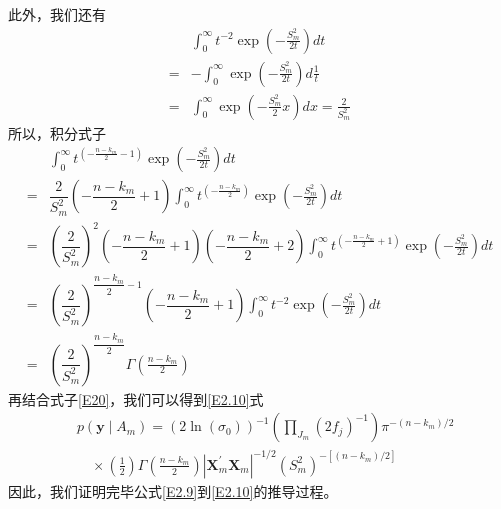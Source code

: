 \documentclass[12pt]{article} %
\begin{document}
	此外，我们还有
	\begin{equation*}
		\begin{aligned}
			& \int_{0}^{\infty} t^{-2} \exp \left(-\frac{S_{m}^{2}}{2 t}\right) d t \\
			=&-\int_{0}^{\infty} \exp \left(-\frac{S_{m}^{2}}{2 t}\right) d \frac{1}{t} \\
			=& \int_{0}^{\infty} \exp \left(-\frac{S_{m}^{2}}{2} x\right) d x 
			= \frac{2}{S_{m}^{2}}
		\end{aligned}
	\end{equation*}
	所以，积分式子
	\begin{equation*}
		\begin{aligned}
			&\int_{0}^{\infty} t^{(-\frac{n-k_{m}}{2}-1)} \exp \left(-\frac{S_{m}^{2}}{2 t}\right) d t \\
			=& \dfrac{2}{S_m^2} (-\dfrac{n-k_m}{2}+1) \int_{0}^{\infty} t^{(-\frac{n-k_{m}}{2})} \exp \left(-\frac{S_{m}^{2}}{2 t}\right) d t \\
			=& \left( \dfrac{2}{S_m^2} \right)^2 (-\dfrac{n-k_m}{2}+1) (-\dfrac{n-k_m}{2}+2) \int_{0}^{\infty} t^{(-\frac{n-k_{m}}{2} +1)} \exp \left(-\frac{S_{m}^{2}}{2 t}\right) d t \\
			=&\left( \dfrac{2}{S_m^2} \right)^{\dfrac{n-k_m}{2}-1}  (-\dfrac{n-k_m}{2}+1) \int_{0}^{\infty} t^{-2} \exp \left(-\frac{S_{m}^{2}}{2 t}\right) d t \\
			=&\left( \dfrac{2}{S_m^2} \right)^{\dfrac{n-k_m}{2}} \Gamma\left(\frac{n-k_{m}}{2}\right)
		\end{aligned}
	\end{equation*}
	再结合式子\eqref{E20}，我们可以得到\eqref{E2.10}式
	\begin{equation*}
		\begin{aligned}
			&p\left(\mathbf{y} \mid A_{m}\right)=\left(2 \ln \left(\sigma_{0}\right)\right)^{-1}\left(\prod_{J_{m}}\left(2 f_{j}\right)^{-1}\right) \pi^{-\left(n-k_{m}\right) / 2} \\
			&\quad \times\left(\frac{1}{2}\right) \Gamma\left(\frac{n-k_{m}}{2}\right)\left|\mathbf{X}_{m}^{\prime} \mathbf{X}_{m}\right|^{-1 / 2}\left(S_{m}^{2}\right)^{-\left[\left(n-k_{m}\right) / 2\right]} 
		\end{aligned}
	\end{equation*}
	因此，我们证明完毕公式\eqref{E2.9}到\eqref{E2.10}的推导过程。
	
	\newpage
	
\end{document}
